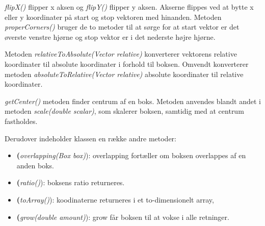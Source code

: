 \emph{flipX()} flipper x aksen og \emph{flipY()} flipper y aksen. Akserne flippes ved at bytte x eller y koordinater på start og stop vektoren med hinanden. Metoden \emph{properCorners()} bruger de to metoder til at sørge for at start vektor er det øverste venstre hjørne og stop vektor er i det nederste højre hjørne.

Metoden \emph{relativeToAbsolute(Vector relative)} konverterer vektorens relative koordinater til absolute koordinater i forhold til boksen. Omvendt konverterer metoden \emph{absoluteToRelative(Vector relative)} absolute koordinater til relative koordinater.

\emph{getCenter()} metoden finder centrum af en boks. Metoden anvendes blandt andet i metoden \emph{scale(double scalar)}, som skalerer boksen, samtidig med at centrum fastholdes.

Derudover indeholder klassen en række andre metoder:

\begin{itemize}
	\item \textbf(\emph{overlapping(Box box)}): overlapping fortæller om boksen overlappes af en anden boks.
	\item \textbf(\emph{ratio()}): boksens ratio returneres.
	\item \textbf(\emph{toArray()}): koodinaterne returneres i et to-dimensionelt array,
	\item \textbf(\emph{grow(double amount)}): grow får boksen til at vokse i alle retninger.
\end{itemize}